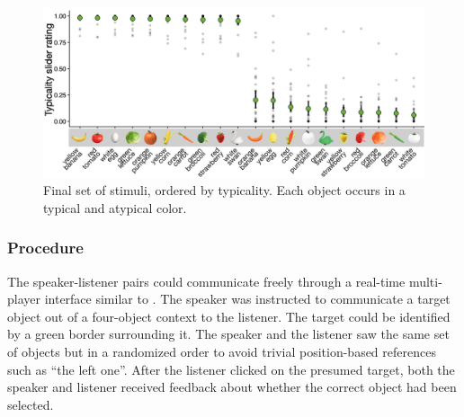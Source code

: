 \documentclass[a4paper,man,floatsintext,natbib]{apa6}
\begin{document}
\begin{figure}
	\includegraphics[width=1\linewidth]{img/norming/typicality_results_wimg.png}
	\caption{Final set of stimuli, ordered by typicality. Each object occurs in a typical and atypical color.}
	\label{fig:finalstimuli}
\end{figure}



\subsubsection{Procedure}

The speaker-listener pairs could communicate freely through a real-time multi-player interface similar to \cite{Hawkins:2015}. The speaker was instructed to communicate a target object out of a four-object context to the listener. The target could be identified by a green border surrounding it. The speaker and the listener saw the same set of objects but in a randomized order to avoid trivial position-based references such as ``the left one''. After the listener clicked on the presumed target, both the speaker and listener received feedback about whether the correct object had been selected.
\end{document}
